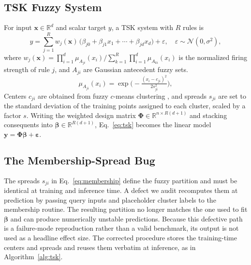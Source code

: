 \documentclass[1p,times]{elsarticle}
\begin{document}
\subsection{TSK Fuzzy System}
\label{sec:tsk}

For input $\mathbf{x}\in\mathbb{R}^d$ and scalar target $y$, a TSK system with $R$ rules is
\begin{equation}
 y = \sum_{j=1}^{R} w_j(\mathbf{x})\,\big(\beta_{j0}+\beta_{j1}x_1+\cdots+\beta_{jd}x_d\big) + \varepsilon,\quad
 \varepsilon\sim\mathcal{N}(0,\sigma^2),
 \label{eq:tsk}
\end{equation}
where $w_j(\mathbf{x})=\prod_{i=1}^{d}\mu_{A_{ji}}(x_i)\big/\sum_{k=1}^{R}\prod_{i=1}^{d}\mu_{A_{ki}}(x_i)$ is the normalized firing strength of rule $j$, and $A_{ji}$ are Gaussian antecedent fuzzy sets.
\begin{equation}
 \mu_{A_{ji}}(x_i)=\exp\!\Big(-\tfrac{(x_i-c_{ji})^2}{2 s_{ji}^2}\Big),
 \label{eq:membership}
\end{equation}
Centers $c_{ji}$ are obtained from fuzzy $c$-means clustering \cite{bezdek1984fcm}, and spreads $s_{ji}$ are set to the standard deviation of the training points assigned to each cluster, scaled by a factor $s$. Writing the weighted design matrix $\boldsymbol{\Phi}\in\mathbb{R}^{n\times R(d+1)}$ and stacking consequents into $\boldsymbol{\beta}\in\mathbb{R}^{R(d+1)}$, Eq.~\eqref{eq:tsk} becomes the linear model $\mathbf{y}=\boldsymbol{\Phi}\boldsymbol{\beta}+\boldsymbol{\varepsilon}$.

\subsection{The Membership-Spread Bug}
\label{sec:bug}

The spreads $s_{ji}$ in Eq.~\eqref{eq:membership} define the fuzzy partition and must be identical at training and inference time.
A defect we audit recomputes them at prediction by passing query inputs and placeholder cluster labels to the membership routine.
The resulting partition no longer matches the one used to fit $\boldsymbol{\beta}$ and can produce numerically unstable predictions.
Because this defective path is a failure-mode reproduction rather than a valid benchmark, its output is not used as a headline effect size.
The corrected procedure stores the training-time centers and spreads and reuses them verbatim at inference, as in Algorithm~\ref{alg:tsk}.
\end{document}
